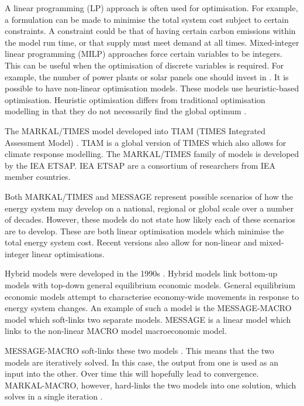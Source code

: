 A linear programming (LP) approach is often used for optimisation. For example, a formulation can be made to minimise the total system cost subject to certain constraints. A constraint could be that of having certain carbon emissions within the model run time, or that supply must meet demand at all times. Mixed-integer linear programming (MILP) \cite{driebeek1966algorithm} approaches force certain variables to be integers. This can be useful when the optimisation of discrete variables is required. For example, the number of power plants or solar panels one should invest in \cite{Ringkjob2018}. It is possible to have non-linear optimisation models. These models use heuristic-based optimisation. Heuristic optimisation differs from traditional optimisation modelling in that they do not necessarily find the global optimum \cite{Banos2011}.  

The MARKAL/TIMES model developed into TIAM (TIMES Integrated Assessment Model) \cite{lehtilae2007iea}. TIAM \cite{loulou2008etsap} is a global version of TIMES which also allows for climate response modelling. The MARKAL/TIMES family of models is developed by the IEA ETSAP. IEA ETSAP are a consortium of researchers from IEA member countries.

Both MARKAL/TIMES  \cite{lehtilae2007iea} and MESSAGE \cite{Schrattenholzer1981} represent possible scenarios of how the energy system may develop on a national, regional or global scale over a number of decades. However, these models do not state how likely each of these scenarios are to develop. These are both linear optimisation models which minimise the total energy system cost. Recent versions also allow for non-linear and mixed-integer linear optimisations.

Hybrid models were developed in the 1990s \cite{Economics2016}. Hybrid models link bottom-up models with top-down general equilibrium economic models. General equilibrium economic models attempt to characterise economy-wide movements in response to energy system changes. An example of such a model is the MESSAGE-MACRO model \cite{Messner2000} which soft-links two separate models. MESSAGE is a linear model which links to the non-linear MACRO model macroeconomic model. 

MESSAGE-MACRO soft-links these two models \cite{Messner2000}. This means that the two models are iteratively solved. In this case, the output from one is used as an input into the other. Over time this will hopefully lead to convergence. MARKAL-MACRO, however, hard-links the two models into one solution, which solves in a single iteration \cite{mannewene92}.

